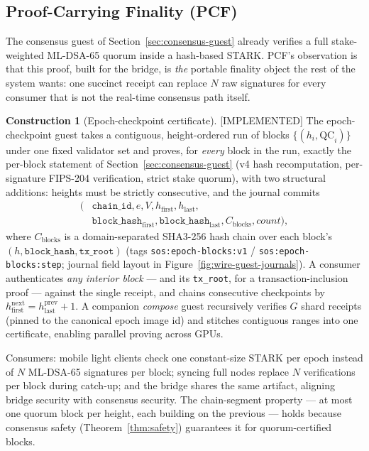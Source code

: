 \documentclass[11pt]{article}
\newcommand{\code}[1]{\texttt{#1}}
\newcommand{\mldsa}{ML\mbox{-}DSA\mbox{-}65}
\newcommand{\sha}{SHA3\mbox{-}256}
\newcommand{\statusI}{\textcolor{statgreen}{\textsf{\scriptsize[IMPLEMENTED]}}}
\theoremstyle{plain}
\theoremstyle{definition}
\newtheorem{construction}[theorem]{Construction}
\theoremstyle{remark}
\begin{document}
\subsection{Proof-Carrying Finality (PCF)}
\label{sec:pcf}

The consensus guest of Section~\ref{sec:consensus-guest} already verifies a
full stake-weighted \mldsa{} quorum inside a hash-based STARK. PCF's
observation is that this proof, built for the bridge, is \emph{the} portable
finality object the rest of the system wants: one succinct receipt can
replace $N$ raw signatures for every consumer that is not the real-time
consensus path itself.

\begin{construction}[Epoch-checkpoint certificate]
\label{con:pcf}
\statusI{} The epoch-checkpoint guest takes a contiguous, height-ordered run
of blocks $\{(h_i, \mathrm{QC}_i)\}$ under one fixed validator set and
proves, for \emph{every} block in the run, exactly the per-block statement
of Section~\ref{sec:consensus-guest} (v4 hash recomputation, per-signature
FIPS-204 verification, strict stake quorum), with two structural additions:
heights must be strictly consecutive, and the journal commits
\[
\begin{aligned}
\big(&\code{chain\_id}, e, V, h_{\mathrm{first}}, h_{\mathrm{last}}, \\
  &\code{block\_hash}_{\mathrm{first}}, \code{block\_hash}_{\mathrm{last}}, C_{\mathrm{blocks}}, \mathit{count}\big),
\end{aligned}
\]
where $C_{\mathrm{blocks}}$ is a domain-separated \sha{} hash chain over
each block's $(h, \code{block\_hash}, \code{tx\_root})$
(tags \code{sos:epoch-blocks:v1} / \code{sos:epoch-blocks:step}; journal
field layout in Figure~\ref{fig:wire-guest-journals}). A consumer
authenticates \emph{any interior block} --- and its \code{tx\_root}, for a
transaction-inclusion proof --- against the single receipt, and chains
consecutive checkpoints by
$h^{\mathrm{next}}_{\mathrm{first}} = h^{\mathrm{prev}}_{\mathrm{last}} + 1$.
A companion \emph{compose} guest recursively verifies $G$ shard receipts
(pinned to the canonical epoch image id) and stitches contiguous ranges into
one certificate, enabling parallel proving across GPUs.
\end{construction}

Consumers: mobile light clients check one constant-size STARK per epoch
instead of $N$ \mldsa{} signatures per block; syncing full nodes replace
$N$ verifications per block during catch-up; and the bridge shares the same
artifact, aligning bridge security with consensus security. The chain-segment
property --- at most one quorum block per height, each building on the
previous --- holds because consensus safety (Theorem~\ref{thm:safety})
guarantees it for quorum-certified blocks.
\end{document}
